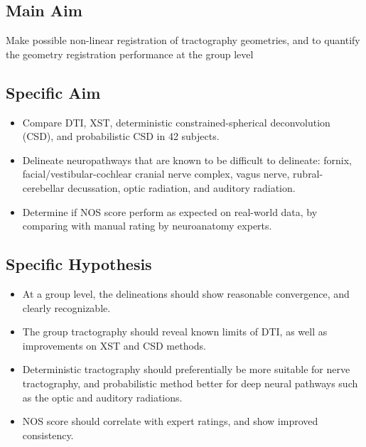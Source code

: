 \subsection{Main Aim}
Make possible non-linear registration of tractography geometries, and to quantify the geometry registration performance at the group level

\subsection{Specific Aim}
\begin{itemize}
    \item Compare DTI, XST, deterministic constrained-spherical deconvolution (CSD), and probabilistic CSD in 42 subjects. 
    \item Delineate neuropathways that are known to be difficult to delineate: fornix, facial/vestibular-cochlear cranial nerve complex, vagus nerve, rubral-cerebellar decussation, optic radiation, and auditory radiation.
    \item Determine if NOS score perform as expected on real-world data, by comparing with manual rating by neuroanatomy experts.
\end{itemize}

\subsection{Specific Hypothesis}
\begin{itemize}
    \item At a group level, the delineations should show reasonable convergence, and clearly recognizable. 
    \item The group tractography should reveal known limits of DTI, as well as improvements on XST and CSD methods.
    \item Deterministic tractography should preferentially be more suitable for nerve tractography, and probabilistic method better for deep neural pathways such as the optic and auditory radiations.
    \item NOS score should correlate with expert ratings, and show improved consistency.
\end{itemize}

